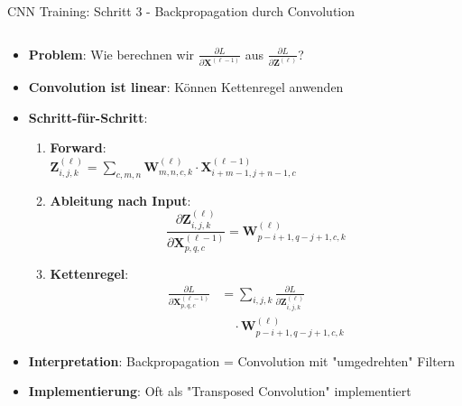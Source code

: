 \documentclass[aspectratio=1610, xcolor=dvipsnames, 9pt]{beamer}
\begin{document}
      \begin{frame}{CNN Training: Schritt 3 - Backpropagation durch Convolution}
        \begin{columns}
          \begin{column}{1\textwidth}
            \begin{itemize}
              \item \textbf{Problem}: Wie berechnen wir $\frac{\partial L}{\partial \mathbf{X}^{(\ell-1)}}$ aus $\frac{\partial L}{\partial \mathbf{Z}^{(\ell)}}$?
              \item \textbf{Convolution ist linear}: Können Kettenregel anwenden
              \item \textbf{Schritt-für-Schritt}:
              \begin{enumerate}
                \item \textbf{Forward}: \\
                      $\mathbf{Z}^{(\ell)}_{i,j,k} = \sum_{c,m,n} \mathbf{W}^{(\ell)}_{m,n,c,k} \cdot \mathbf{X}^{(\ell-1)}_{i+m-1,j+n-1,c}$
                \item \textbf{Ableitung nach Input}: 
                \begin{equation}
                  \frac{\partial \mathbf{Z}^{(\ell)}_{i,j,k}}{\partial \mathbf{X}^{(\ell-1)}_{p,q,c}} = \mathbf{W}^{(\ell)}_{p-i+1,q-j+1,c,k}
                \end{equation}
                \item \textbf{Kettenregel}:
                \begin{align}
                  \frac{\partial L}{\partial \mathbf{X}^{(\ell-1)}_{p,q,c}} &= \sum_{i,j,k} \frac{\partial L}{\partial \mathbf{Z}^{(\ell)}_{i,j,k}} \\
                  &\quad \cdot \mathbf{W}^{(\ell)}_{p-i+1,q-j+1,c,k}
                \end{align}
              \end{enumerate}
              \item \textbf{Interpretation}: Backpropagation = Convolution mit "umgedrehten" Filtern
              \item \textbf{Implementierung}: Oft als "Transposed Convolution" implementiert
            \end{itemize}
          \end{column}
        \end{columns}
      \end{frame}
\end{document}
